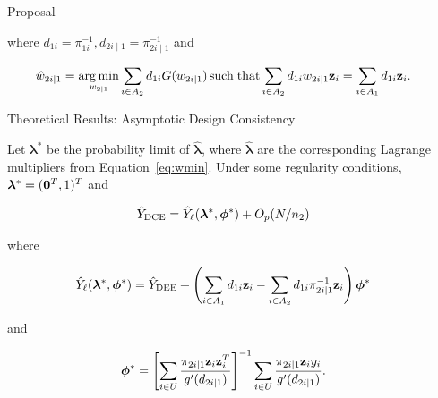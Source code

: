 \documentclass[final]{beamer}
\DeclareMathOperator*{\argmin}{arg\,min}
\DeclareMathOperator*{\suchthat}{such\; that}
\newlength{\sepwidth}
\newlength{\colwidth}
\newcommand{\separatorcolumn}{\begin{column}{\sepwidth}\end{column}}
\begin{document}
\begin{frame}[t]
\begin{columns}[t]
\begin{column}{\colwidth}
\begin{alertblock}{Proposal}
    \vspace{-1.0cm}

    where $d_{1i} = \pi_{1i}^{-1}, d_{2i \mid 1}= \pi_{2i \mid 1}^{-1}$ and 
    \vspace{-0.5cm}

    \begin{equation}\label{eq:wmin}
    \hat w_{2i|1} = \argmin_{w_{2|1}} \sum_{i \in A_2} d_{1i} G(w_{2i|1})
    \suchthat \sum_{i \in A_2} d_{1i} w_{2i|1} {\bf{z}}_i = 
    \sum_{i \in A_1} d_{1i} {\bf{z}}_i.
    \end{equation}
    
    \vspace{-0.5cm}
  \end{alertblock}

  \begin{exampleblock}{Theoretical Results: Asymptotic Design Consistency}

    Let $\bm \lambda^*$ be the probability limit of $\hat{\bm \lambda}$,
    where $\hat{\bm \lambda}$ are the corresponding Lagrange multipliers from
    Equation~\ref{eq:wmin}.
    Under some regularity conditions, $\bm \lambda^* = ({\bf 0}^T, 1)^T$ and

    $$\hat Y_{\rm{DCE}} = \hat Y_\ell(\bm \lambda^*, \bm \phi^*) + O_p(N / n_2)$$

    where
    \vspace{-1.3cm}

    $$\hat Y_{\ell}(\bm \lambda^*, \bm \phi^*) = \hat Y_{\rm{DEE}}+ 
    \left(\sum_{i \in A_1} d_{1i} {\bf z}_i - \sum_{i \in A_2} d_{1i} 
    \pi_{2i \mid 1}^{-1}  {\bf z}_i \right)\bm \phi^*$$

    \vspace{-1.3cm}
    and
    \vspace{-0.3cm}

    $$
    \bm \phi^* = 
    \left[\sum_{i \in U} \frac{\pi_{2i|1}{\bf z}_i {\bf z}_i^T}{g'(d_{2i|1})}\right]^{-1}
    \sum_{i \in U} \frac{\pi_{2i|1}{\bf z}_i y_i}{g'(d_{2i|1})}.
    $$

    \vspace{-0.5cm}

  \end{exampleblock}

\end{column}

\separatorcolumn


\end{columns}
\end{frame}
\end{document}
